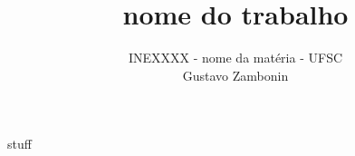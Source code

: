 \documentclass{article}
\title{\bf{nome do trabalho}}
\author{INEXXXX - nome da matéria - UFSC \\
Gustavo Zambonin}
\date{\semester}
\begin{document}
\maketitle

stuff
\end{document}
